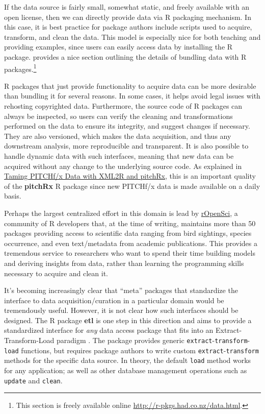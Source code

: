 \documentclass[11pt]{isuthesis}
\begin{document}
If the data source is fairly small, somewhat static, and freely
available with an open license, then we can directly provide data via R
packaging mechanism. In this case, it is best practice for package
authors include scripts used to acquire, transform, and clean the data.
This model is especially nice for both teaching and providing examples,
since users can easily access data by installing the R package.
\citep{rpkgs} provides a nice section outlining the details of bundling
data with R packages.\footnote{This section is freely available online
  \url{http://r-pkgs.had.co.nz/data.html}.}

R packages that just provide functionality to acquire data can be more
desirable than bundling it for several reasons. In some cases, it helps
avoid legal issues with rehosting copyrighted data. Furthermore, the
source code of R packages can always be inspected, so users can verify
the cleaning and transformations performed on the data to ensure its
integrity, and suggest changes if necessary. They are also versioned,
which makes the data acquisition, and thus any downstream analysis, more
reproducible and transparent. It is also possible to handle dynamic data
with such interfaces, meaning that new data can be acquired without any
change to the underlying source code. As explained in
\protect\hyperlink{taming-pitchfx-data-with-xml2r-and-pitchrx}{Taming
PITCHf/x Data with XML2R and pitchRx}, this is an important quality of
the \textbf{pitchRx} R package since new PITCHf/x data is made available
on a daily basis.

Perhaps the largest centralized effort in this domain is lead by
\href{https://ropensci.org}{rOpenSci}, a community of R developers that,
at the time of writing, maintains more than 50 packages providing access
to scientific data ranging from bird sightings, species occurrence, and
even text/metadata from academic publications. This provides a
tremendous service to researchers who want to spend their time building
models and deriving insights from data, rather than learning the
programming skills necessary to acquire and clean it.

It's becoming increasingly clear that ``meta'' packages that standardize
the interface to data acquisition/curation in a particular domain would
be tremendously useful. However, it is not clear how such interfaces
should be designed. The R package \textbf{etl} is one step in this
direction and aims to provide a standardized interface for \emph{any}
data access package that fits into an Extract-Transform-Load paradigm
\citep{etl}. The package provides generic
\texttt{extract}-\texttt{transform}-\texttt{load} functions, but
requires package authors to write custom
\texttt{extract}-\texttt{transform} methods for the specific data
source. In theory, the default \texttt{load} method works for any
application; as well as other database management operations such as
\texttt{update} and \texttt{clean}.
\end{document}
